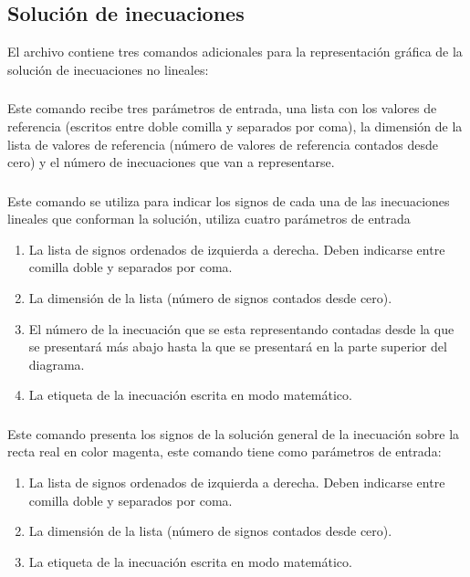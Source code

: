 \documentclass[10pt,a4paper]{article}
\begin{document}
\begin{tikzPlusCode}
\end{tikzPlusCode}

\subsection{Solución de inecuaciones} El archivo  contiene tres comandos adicionales para la representación gráfica de la solución de inecuaciones no lineales:

\subsubsection{} Este comando recibe tres parámetros de entrada, una lista con los valores de referencia (escritos entre doble comilla y separados por coma), la dimensión de la lista de valores de referencia (número de valores de referencia contados desde cero) y el número de inecuaciones que van a representarse.

\subsubsection{} Este comando se utiliza para indicar los signos de cada una de las inecuaciones lineales que conforman la solución, utiliza cuatro parámetros de entrada
  \begin{enumerate}
    \item La lista de signos ordenados de izquierda a derecha. Deben indicarse entre comilla doble y separados por coma.
    \item La dimensión de la lista (número de signos contados desde cero).
    \item El número de la inecuación que se esta representando contadas desde la que se presentará más abajo hasta la que se presentará en la parte superior del diagrama.
    \item La etiqueta de la inecuación escrita en modo matemático.
  \end{enumerate}

\subsubsection{} Este comando presenta los signos de la solución general de la inecuación sobre la recta real en color magenta, este comando tiene como parámetros de entrada:
  \begin{enumerate}
    \item La lista de signos ordenados de izquierda a derecha. Deben indicarse entre comilla doble y separados por coma.
    \item La dimensión de la lista (número de signos contados desde cero).
    \item La etiqueta de la inecuación escrita en modo matemático.
  \end{enumerate}
\end{document}
